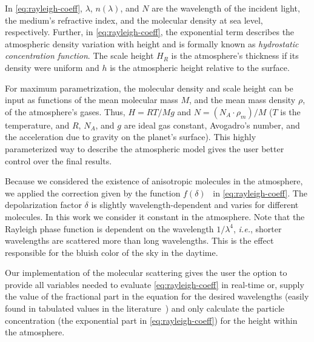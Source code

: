 \documentclass[journal]{vgtc}                %
\newcommand{\review}[1]{{\color{blue}#1}}
\begin{document}
In \autoref{eq:rayleigh-coeff}, $\lambda$, $n(\lambda)$, and $N$ are the wavelength of the incident light, the medium's refractive index, and the molecular density at sea level, respectively. Further, in \autoref{eq:rayleigh-coeff}, the exponential term describes the atmospheric density variation with height and is formally known as \emph{hydrostatic concentration function}. The scale height $H_R$ is the atmosphere's thickness if its density were uniform and $h$ is 
the atmospheric height relative to the surface.

For maximum parametrization, the molecular density and scale height can be input as functions of the mean molecular mass $M$, and the mean mass density $\rho$, of the atmosphere's gases. Thus, $H = RT/Mg$ and $N = (N_A\cdot \rho_{m})/M$ ($T$ is the temperature, and $R$, $N_A$, and $g$ are ideal gas constant, Avogadro's number, and the acceleration due to gravity on the planet's surface). This highly parameterized way to describe the atmospheric model gives the user better control over the final results.


Because we considered the existence of anisotropic molecules in the atmosphere, we applied the correction given by the function $f(\delta)$~\cite{Liou:2002} in \autoref{eq:rayleigh-coeff}. The depolarization factor $\delta$ is slightly wavelength-dependent and varies for different molecules. In this work we consider it constant in the atmosphere.
Note that the Rayleigh phase function is dependent on the wavelength $1/\lambda^4$, \textit{i.e.}, shorter wavelengths are scattered more than long wavelengths. This is the effect responsible for the bluish color of the sky in the daytime.

Our implementation of the molecular scattering gives the user the option to provide all variables needed to evaluate \autoref{eq:rayleigh-coeff} in real-time or, supply the value of the fractional part in the equation for the desired wavelengths (easily found in tabulated values in the literature~\cite{Penndorf:1957}) and only calculate the particle concentration (the exponential part in \autoref{eq:rayleigh-coeff}) for the height within the atmosphere.\\
\vspace*{-3.5mm}
\end{document}
